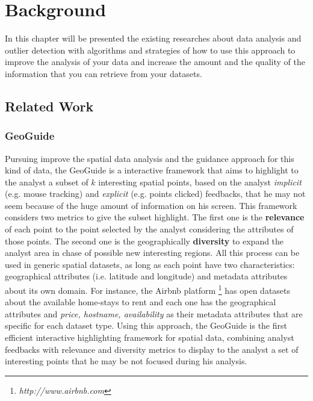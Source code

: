\chapter{Background}


In this chapter will be presented the existing researches about data analysis and 
outlier detection with algorithms and strategies of how to use this approach to 
improve the analysis of your data and increase the amount and the quality of the 
information that you can retrieve from your datasets.

\section{Related Work}

\subsection{GeoGuide}


Pursuing improve the spatial data analysis and the guidance approach for this kind of data, the GeoGuide \cite{omidvarTehrani2017} is a interactive framework that aims to highlight to the analyst a subset of $k$ interesting spatial points, based on the analyst \textit{implicit} (e.g. mouse tracking) and \textit{explicit} (e.g. points clicked) feedbacks, that he may not seem because of the huge amount of information on his screen. This framework considers two metrics to give the subset highlight. The first one is the \textbf{relevance} of each point to the point selected by the analyst considering the attributes of those points. The second one is the geographically \textbf{diversity} to expand the analyst area in chase of possible new interesting regions. All this process can be used in generic spatial datasets, as long as each point have two characteristics: geographical attributes (i.e. latitude and longitude) and metadata attributes about its own domain. For instance, the Airbnb platform \footnote{\it http://www.airbnb.com} has open datasets about the available home-stays to rent and each one has the geographical attributes and \textit{price, hostname, availability} as their metadata attributes that are specific for each dataset type. Using this approach, the GeoGuide is the first efficient interactive highlighting framework for spatial data, combining analyst feedbacks with relevance and diversity metrics to display to the analyst a set of interesting points that he may be not focused during his analysis.

